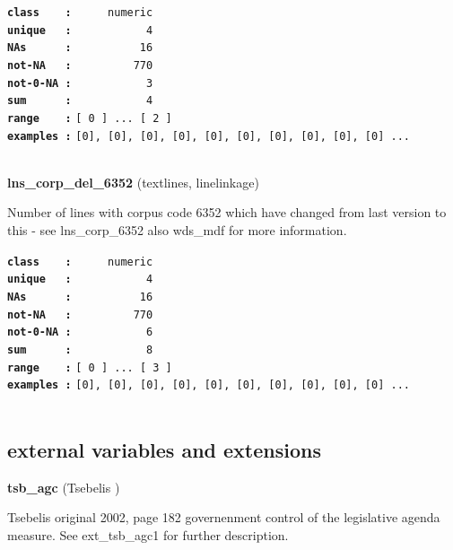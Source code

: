 \documentclass[]{article}
\begin{document}
\textbf{\texttt{class\ \ \ \ :}} \texttt{~~~~~numeric}\\
\textbf{\texttt{unique\ \ \ :}} \texttt{~~~~~~~~~~~4}\\
\textbf{\texttt{NAs\ \ \ \ \ \ :}} \texttt{~~~~~~~~~~16}\\
\textbf{\texttt{not-NA\ \ \ :}} \texttt{~~~~~~~~~770}\\
\textbf{\texttt{not-0-NA\ :}} \texttt{~~~~~~~~~~~3}\\
\textbf{\texttt{sum\ \ \ \ \ \ :}} \texttt{~~~~~~~~~~~4}\\
\textbf{\texttt{range\ \ \ \ :}}
\texttt{{[}\ 0\ {]}\ ...\ {[}\ 2\ {]}}\\
\textbf{\texttt{examples\ :}}
\texttt{{[}0{]},\ {[}0{]},\ {[}0{]},\ {[}0{]},\ {[}0{]},\ {[}0{]},\ {[}0{]},\ {[}0{]},\ {[}0{]},\ {[}0{]}\ ...}\\

~

\textbf{lns\_corp\_del\_6352} (textlines, linelinkage)

Number of lines with corpus code 6352 which have changed from last
version to this - see lns\_corp\_6352 also wds\_mdf for more
information.

\textbf{\texttt{class\ \ \ \ :}} \texttt{~~~~~numeric}\\
\textbf{\texttt{unique\ \ \ :}} \texttt{~~~~~~~~~~~4}\\
\textbf{\texttt{NAs\ \ \ \ \ \ :}} \texttt{~~~~~~~~~~16}\\
\textbf{\texttt{not-NA\ \ \ :}} \texttt{~~~~~~~~~770}\\
\textbf{\texttt{not-0-NA\ :}} \texttt{~~~~~~~~~~~6}\\
\textbf{\texttt{sum\ \ \ \ \ \ :}} \texttt{~~~~~~~~~~~8}\\
\textbf{\texttt{range\ \ \ \ :}}
\texttt{{[}\ 0\ {]}\ ...\ {[}\ 3\ {]}}\\
\textbf{\texttt{examples\ :}}
\texttt{{[}0{]},\ {[}0{]},\ {[}0{]},\ {[}0{]},\ {[}0{]},\ {[}0{]},\ {[}0{]},\ {[}0{]},\ {[}0{]},\ {[}0{]}\ ...}\\

~

\subsection{external variables and
extensions}\label{external-variables-and-extensions}

\textbf{tsb\_agc} (Tsebelis )

Tsebelis original 2002, page 182 governenment control of the legislative
agenda measure. See ext\_tsb\_agc1 for further description.
\end{document}
